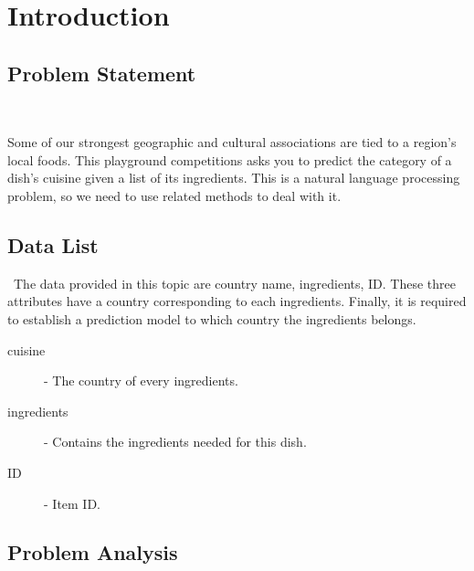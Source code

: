 \section{Introduction}\label{sec-intro}





\subsection{Problem Statement}
\

Some of our strongest geographic and cultural associations are tied to a region's local foods. 
This playground competitions asks you to predict the category of a dish's cuisine given a list of its
ingredients. This is a natural language processing problem, so we need to use related methods to deal with it.
\subsection{Data List}
\
The data provided in this topic are country name, ingredients, ID. These three attributes have a country corresponding to each ingredients.
 Finally, it is required to establish a prediction model to which country the ingredients belongs.
\begin{description}
  \item [cuisine] - The country of every ingredients.
  \item [ingredients] - Contains the ingredients needed for this dish.
  \item [ID] - Item ID.
\end{description}

\subsection{Problem Analysis}
\

